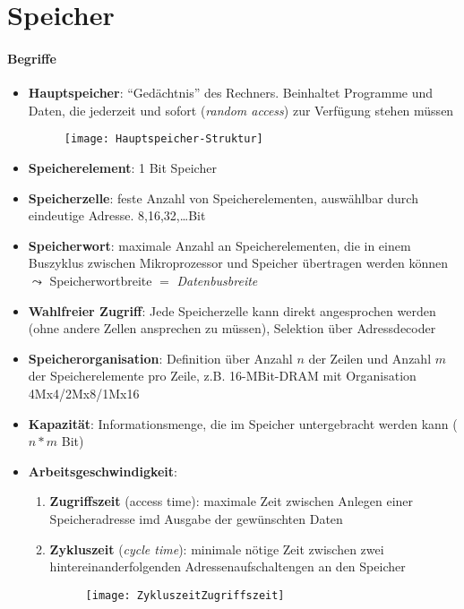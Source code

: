 \section{Speicher}
\label{sec:speicher}

\paragraph{Begriffe}
\begin{itemize}
	\item \textbf{Hauptspeicher}: "`Gedächtnis"' des Rechners. Beinhaltet Programme und Daten, die jederzeit und sofort (\emph{random access}) zur Verfügung stehen müssen
	\begin{figure}[H]\centering\label{Hauptspeicher-Struktur}\texttt{[image: Hauptspeicher-Struktur]}\end{figure}

	\item \textbf{Speicherelement}: 1 Bit Speicher

	\item \textbf{Speicherzelle}: feste Anzahl von Speicherelementen, auswählbar durch eindeutige Adresse. 8,16,32,\dots Bit

	\item \textbf{Speicherwort}: maximale Anzahl an Speicherelementen, die in einem Buszyklus zwischen Mikroprozessor und Speicher übertragen werden können \( \leadsto \) Speicherwortbreite \( = \) \emph{Datenbusbreite}

	\item \textbf{Wahlfreier Zugriff}: Jede Speicherzelle kann direkt angesprochen werden (ohne andere Zellen ansprechen zu müssen), Selektion über Adressdecoder

	\item \textbf{Speicherorganisation}: Definition über Anzahl \( n \) der Zeilen und Anzahl \( m \) der Speicherelemente pro Zeile, z.B. 16-MBit-DRAM mit Organisation 4Mx4/2Mx8/1Mx16

	\item \textbf{Kapazität}: Informationsmenge, die im Speicher untergebracht werden kann (\( n*m \) Bit)

	\item \textbf{Arbeitsgeschwindigkeit}:
	\begin{enumerate}
		\item \textbf{Zugriffszeit} (\emph{}access time): maximale Zeit zwischen Anlegen einer Speicheradresse imd Ausgabe der gewünschten Daten

		\item \textbf{Zykluszeit} (\emph{cycle time}): minimale nötige Zeit zwischen zwei hintereinanderfolgenden Adressenaufschaltengen an den Speicher

		\begin{figure}[H]\centering\label{ZykluszeitZugriffszeit}\texttt{[image: ZykluszeitZugriffszeit]}\end{figure}
	\end{enumerate}
\end{itemize}

